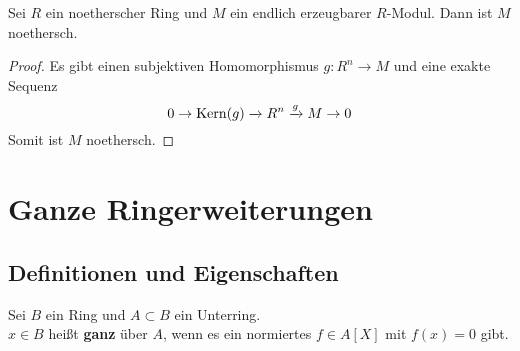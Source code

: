	\begin{satz}
		Sei $R$ ein noetherscher Ring und $M$ ein endlich erzeugbarer $R$-Modul. Dann ist $M$ noethersch.
	\end{satz}
	\begin{proof}
		Es gibt einen subjektiven Homomorphismus $g:R^n\to M$ und eine exakte Sequenz
		\[0\to \operatorname{Kern}(g)\xrightarrow{ }R^n\xrightarrow{g}M\to0\]
		Somit ist $M$ noethersch.
	\end{proof}




	\section{Ganze Ringerweiterungen}
	\subsection{Definitionen und Eigenschaften}
	\begin{definition}
		Sei $B$ ein Ring und $A\subset B$ ein Unterring.\\
		$x\in B$ heißt \textbf{ganz} über $A$, wenn es ein normiertes $f\in A[X]$ mit $f(x)=0$ gibt.
	\end{definition}

